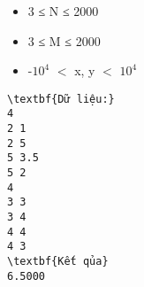 \begin{itemize}
	\item     3 ≤ N ≤ 2000   
	\item     3 ≤ M ≤ 2000   
	\item     -$10^{4}$    $<$ x, y $<$ $10^{4}$
\end{itemize}
\begin{verbatim}
\textbf{Dữ liệu:}
4
2 1 
2 5  
5 3.5  
5 2
4
3 3 
3 4 
4 4 
4 3  
\textbf{Kết qủa}
6.5000
\end{verbatim}